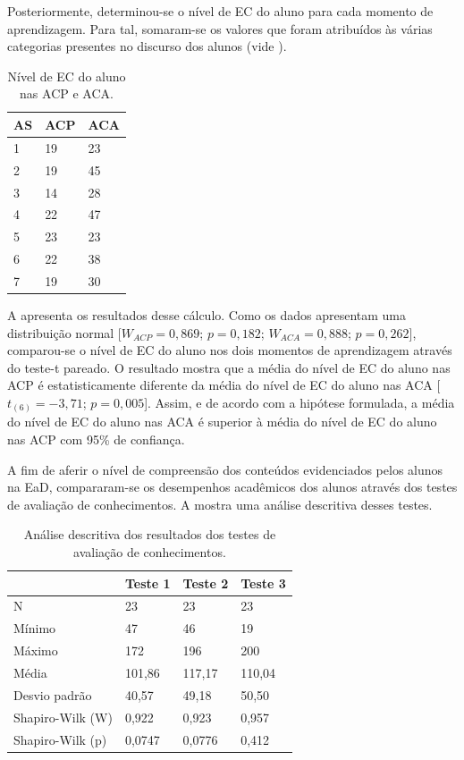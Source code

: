 \documentclass[portuguese]{textolivre}
\begin{document}
Posteriormente, determinou-se o nível de EC do aluno para cada momento de aprendizagem. Para tal, somaram-se os valores que foram atribuídos às várias categorias presentes no discurso dos alunos (vide ).

\begin{table}[htb]
\caption{Nível de EC do aluno nas ACP e ACA.}
\label{tab3}
\centering
\begin{tabular}{lll}
\toprule
\textbf{AS} & \textbf{ACP} & \textbf{ACA}
\\
\midrule
1 & 19 & 23
\\
2 & 19 &45
\\
3 & 14 & 28
\\
4 & 22 &47
\\
5 & 23 & 23
\\
6 & 22 & 38
\\
7 & 19 & 30
\\
\bottomrule
\end{tabular}
\centering
{}
\end{table}

A  apresenta os resultados desse cálculo. Como os dados apresentam uma distribuição normal [$W_{ACP}=0,869$; $p=0,182$; $W_{ACA}=0,888$; $p=0,262$], comparou-se o nível de EC do aluno nos dois momentos de aprendizagem através do teste-t pareado. O resultado mostra que a média do nível de EC do aluno nas ACP é estatisticamente diferente da média do nível de EC do aluno nas ACA [$t_{(6)}=-3,71$; $p=0,005$]. Assim, e de acordo com a hipótese formulada, a média do nível de EC do aluno nas ACA é superior à média do nível de EC do aluno nas ACP com 95\% de confiança. 

A fim de aferir o nível de compreensão dos conteúdos evidenciados pelos alunos na EaD, compararam-se os desempenhos acadêmicos dos alunos através dos testes de avaliação de conhecimentos. A  mostra uma análise descritiva desses testes.

\begin{table}[htpb]
\caption{Análise descritiva dos resultados dos testes de avaliação de conhecimentos.}
\label{tab4}
\centering
\begin{tabular}{llll}
\toprule
& \textbf{Teste 1} & \textbf{Teste 2} & \textbf{Teste 3}
\\
\midrule
N & 23 & 23 & 23
\\
Mínimo & 47 & 46 & 19
\\
Máximo & 172 & 196 & 200
\\
Média & 101,86 & 117,17 & 110,04
\\
Desvio padrão & 40,57 & 49,18 & 50,50
\\
Shapiro-Wilk (W) & 0,922 & 0,923 & 0,957
\\
Shapiro-Wilk (p) & 0,0747 & 0,0776 & 0,412
\\
\bottomrule
\end{tabular}
\centering
{}
\end{table}
\end{document}
